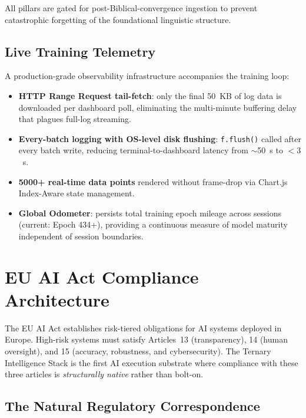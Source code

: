 \documentclass[journal,10pt,twocolumn]{IEEEtran}
\begin{document}
All pillars are gated for post-Biblical-convergence ingestion to prevent
catastrophic forgetting of the foundational linguistic structure.

\subsection{Live Training Telemetry}

A production-grade observability infrastructure accompanies the training loop:

\begin{itemize}
  \item \textbf{HTTP Range Request tail-fetch}: only the final 50~KB of log
        data is downloaded per dashboard poll, eliminating the multi-minute
        buffering delay that plagues full-log streaming.
  \item \textbf{Every-batch logging with OS-level disk flushing}:
        \texttt{f.flush()} called after every batch write, reducing terminal-to-dashboard
        latency from $\sim$50~s to ${<}3$~s.
  \item \textbf{5000+ real-time data points} rendered without frame-drop via
        Chart.js Index-Aware state management.
  \item \textbf{Global Odometer}: persists total training epoch mileage across
        sessions (current: Epoch 434+), providing a continuous measure of
        model maturity independent of session boundaries.
\end{itemize}

\section{EU AI Act Compliance Architecture}
\label{sec:euaiact}

The EU AI Act establishes risk-tiered obligations for AI systems deployed in
Europe. High-risk systems must satisfy Articles~13 (transparency), 14 (human
oversight), and 15 (accuracy, robustness, and cybersecurity). The Ternary
Intelligence Stack is the first AI execution substrate where compliance with
these three articles is \emph{structurally native} rather than bolt-on.

\subsection{The Natural Regulatory Correspondence}
\end{document}
